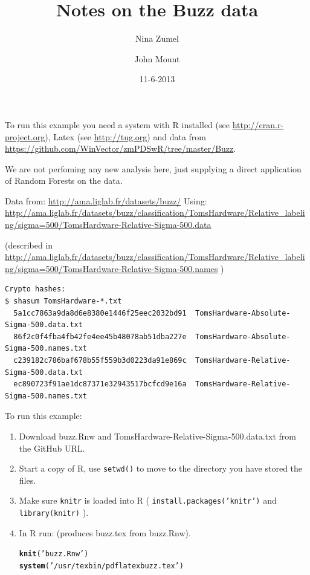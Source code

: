 \documentclass{article}\usepackage[]{graphicx}\usepackage[]{color}
\makeatletter
\newcommand{\hlstr}[1]{\textcolor[rgb]{0.192,0.494,0.8}{#1}}%
\newcommand{\hlstd}[1]{\textcolor[rgb]{0.345,0.345,0.345}{#1}}%
\newcommand{\hlkwd}[1]{\textcolor[rgb]{0.737,0.353,0.396}{\textbf{#1}}}%
\newenvironment{kframe}{%
 \def\at@end@of@kframe{}%
 \ifinner\ifhmode%
  \def\at@end@of@kframe{\end{minipage}}%
  \begin{minipage}{\columnwidth}%
 \fi\fi%
 \def\FrameCommand##1{\hskip\@totalleftmargin \hskip-\fboxsep
 \colorbox{shadecolor}{##1}\hskip-\fboxsep
     \hskip-\linewidth \hskip-\@totalleftmargin \hskip\columnwidth}%
 \MakeFramed {\advance\hsize-\width
   \@totalleftmargin\z@ \linewidth\hsize
   \@setminipage}}%
 {\par\unskip\endMakeFramed%
 \at@end@of@kframe}
\newenvironment{knitrout}{}{} %
\makeatother
\begin{document}
\title{Notes on the Buzz data}
\author{Nina Zumel}
\author{John Mount}
\date{11-6-2013}
\maketitle

To run this example you need a system with R installed 
(see \url{http://cran.r-project.org}),
Latex (see \url{http://tug.org}) and data from 
\url{https://github.com/WinVector/zmPDSwR/tree/master/Buzz}.

We are not perfoming any new analysis here, just supplying a direct application of Random Forests on the data.

Data from: \url{http://ama.liglab.fr/datasets/buzz/}
Using: 
   \url{http://ama.liglab.fr/datasets/buzz/classification/TomsHardware/Relative_labeling/sigma=500/TomsHardware-Relative-Sigma-500.data}

(described in \url{http://ama.liglab.fr/datasets/buzz/classification/TomsHardware/Relative_labeling/sigma=500/TomsHardware-Relative-Sigma-500.names} )

\begin{verbatim}
Crypto hashes:
$ shasum TomsHardware-*.txt
  5a1cc7863a9da8d6e8380e1446f25eec2032bd91  TomsHardware-Absolute-Sigma-500.data.txt
  86f2c0f4fba4fb42fe4ee45b48078ab51dba227e  TomsHardware-Absolute-Sigma-500.names.txt
  c239182c786baf678b55f559b3d0223da91e869c  TomsHardware-Relative-Sigma-500.data.txt
  ec890723f91ae1dc87371e32943517bcfcd9e16a  TomsHardware-Relative-Sigma-500.names.txt
\end{verbatim}

To run this example:
\begin{enumerate}
\item Download buzz.Rnw and TomsHardware-Relative-Sigma-500.data.txt from the GitHub URL.
\item Start a copy of R, use {\tt setwd()} to move to the directory you have stored the files.
\item Make sure {\tt knitr} is loaded into R ( {\tt install.packages('knitr')} and
{\tt library(knitr)} ).
\item In R run: (produces buzz.tex from buzz.Rnw).
\begin{knitrout}
\color{fgcolor}\begin{kframe}
\begin{alltt}
\hlkwd{knit}\hlstd{(}\hlstr{'buzz.Rnw'}\hlstd{)}
\hlkwd{system}\hlstd{(}\hlstr{'/usr/texbin/pdflatex buzz.tex'}\hlstd{)}
\end{alltt}
\end{kframe}
\end{knitrout}

\end{enumerate}
\end{document}
